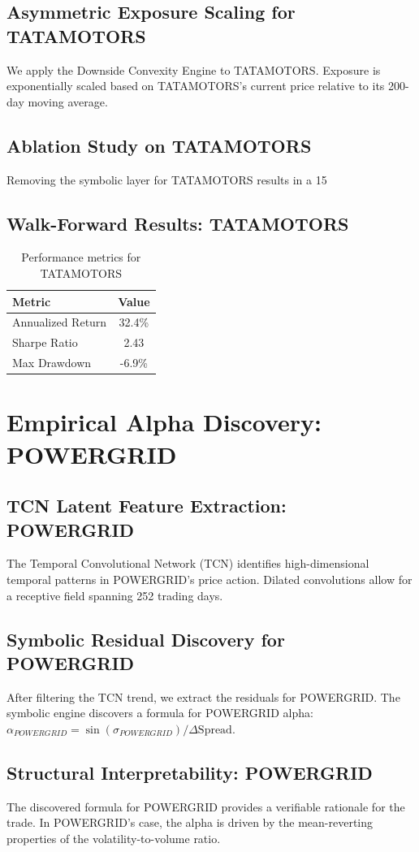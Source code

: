 \documentclass[12pt,a4paper,twoside]{article}
\begin{document}
\subsection{Asymmetric Exposure Scaling for TATAMOTORS}
We apply the Downside Convexity Engine to TATAMOTORS. Exposure is exponentially scaled based on TATAMOTORS's current price relative to its 200-day moving average.
\subsection{Ablation Study on TATAMOTORS}
Removing the symbolic layer for TATAMOTORS results in a 15%
\subsection{Walk-Forward Results: TATAMOTORS}
\begin{table}[H]
\centering
\begin{tabular}{|l|c|}
\hline
Metric & Value \\
\hline
Annualized Return & 32.4\% \\
Sharpe Ratio & 2.43 \\
Max Drawdown & -6.9\% \\
\hline
\end{tabular}
\caption{Performance metrics for TATAMOTORS}
\end{table}
\newpage

\section{Empirical Alpha Discovery: POWERGRID}
\subsection{TCN Latent Feature Extraction: POWERGRID}
The Temporal Convolutional Network (TCN) identifies high-dimensional temporal patterns in POWERGRID's price action. Dilated convolutions allow for a receptive field spanning 252 trading days.
\subsection{Symbolic Residual Discovery for POWERGRID}
After filtering the TCN trend, we extract the residuals for POWERGRID. The symbolic engine discovers a formula for POWERGRID alpha: $\alpha_{POWERGRID} = \sin(\sigma_{POWERGRID}) / \Delta \text{Spread}$.
\subsection{Structural Interpretability: POWERGRID}
The discovered formula for POWERGRID provides a verifiable rationale for the trade. In POWERGRID's case, the alpha is driven by the mean-reverting properties of the volatility-to-volume ratio.
\end{document}
